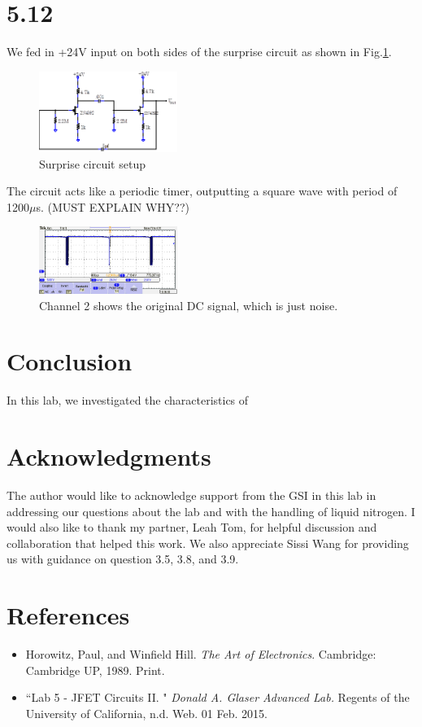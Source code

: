 \documentclass[authoryear, 12pt,5p, times]{elsarticle}
\begin{document}
  \section*{5.12}
  We fed in +24V input on both sides of the surprise circuit as shown in Fig.\ref{q12setup}. 
   \begin{figure}
 \centering
 \includegraphics[width=0.4\textwidth]{figure/q12setup}
\caption{Surprise circuit setup}
\label{q12setup}
 \end{figure}
  The circuit acts like a periodic timer, outputting a square wave with period of 1200$\mu$s. (MUST EXPLAIN WHY??)
 \begin{figure}
 \centering
 \includegraphics[width=0.4\textwidth]{figure/q12trace}
\caption{Channel 2 shows the original DC signal, which is just noise.}
\label{q12trace}
 \end{figure}
 \section*{Conclusion}
In this lab, we investigated the characteristics of  
\section*{Acknowledgments}
\begin{footnotesize}
The author would like to acknowledge support from the GSI in this lab in addressing our questions about the lab and with the handling of liquid nitrogen. I would also like to thank my partner, Leah Tom, for helpful discussion and collaboration that helped this work. We also appreciate Sissi Wang for providing us with guidance on question 3.5, 3.8, and 3.9.
\end{footnotesize}
  \section*{References}
 \begin{footnotesize}
 \begin{itemize}
 \item Horowitz, Paul, and Winfield Hill. \textit{The Art of Electronics}. Cambridge: Cambridge UP, 1989. Print.
 \item ``Lab 5 - JFET Circuits II. " \textit{Donald A. Glaser Advanced Lab.} Regents of the University of California, n.d. Web. 01 Feb. 2015.
 \end{itemize} 
  \end{footnotesize}
\end{document}
